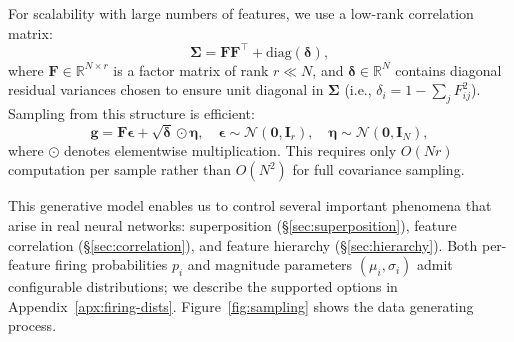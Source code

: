 \documentclass{article}
\theoremstyle{plain}
\theoremstyle{definition}
\theoremstyle{remark}
\begin{document}
For scalability with large numbers of features, we use a low-rank correlation matrix:
\begin{equation}
\boldsymbol{\Sigma} = \mathbf{F}\mathbf{F}^\top + \text{diag}(\boldsymbol{\delta}),
\end{equation}
where $\mathbf{F} \in \mathbb{R}^{N \times r}$ is a factor matrix of rank $r \ll N$, and $\boldsymbol{\delta} \in \mathbb{R}^N$ contains diagonal residual variances chosen to ensure unit diagonal in $\boldsymbol{\Sigma}$ (i.e., $\delta_i = 1 - \sum_j F_{ij}^2$). Sampling from this structure is efficient:
\begin{equation}
\mathbf{g} = \mathbf{F}\boldsymbol{\epsilon} + \sqrt{\boldsymbol{\delta}} \odot \boldsymbol{\eta}, \quad \boldsymbol{\epsilon} \sim \mathcal{N}(\mathbf{0}, \mathbf{I}_r), \quad \boldsymbol{\eta} \sim \mathcal{N}(\mathbf{0}, \mathbf{I}_N),
\end{equation}
where $\odot$ denotes elementwise multiplication. This requires only $O(Nr)$ computation per sample rather than $O(N^2)$ for full covariance sampling.

This generative model enables us to control several important phenomena that arise in real neural networks: superposition (\S\ref{sec:superposition}), feature correlation (\S\ref{sec:correlation}), and feature hierarchy (\S\ref{sec:hierarchy}). Both per-feature firing probabilities $p_i$ and magnitude parameters $(\mu_i, \sigma_i)$ admit configurable distributions; we describe the supported options in Appendix~\ref{apx:firing-dists}. Figure~\ref{fig:sampling} shows the data generating process.

% 
\end{document}
